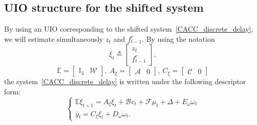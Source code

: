 {\subsection{UIO structure for the shifted system}\label{obs_structure}
By using an UIO corresponding to the shifted system~\eqref{CACC_discrete_delay}, we will estimate simultaneously $z_{t}$ and $f^{c}_{t-1}$. By using the notation
$$
\xi_{t} \triangleq \begin{bmatrix} z_{t} \\ f^{c}_{t-1}\end{bmatrix},
$$
$$
\mathbb{E} =\begin{bmatrix} \mathbb{I}_{3} & \mathcal{W}\end{bmatrix},~
    A_{\xi}=\begin{bmatrix} \mathcal{A} & 0 \end{bmatrix},~
    C_{\xi} = \begin{bmatrix} \mathcal{C}& 0 \end{bmatrix} 
$$
the system~\eqref{CACC_discrete_delay} is written under the following descriptor form:
\begin{equation}
    \left\{\begin{array}{l}
    \mathbb{E} \xi_{t+1} = A_{\xi} \xi_t + \mathcal{B} v_{t} + \mathcal{F} \mu_{t} + \Delta + E_{\omega} \omega_{t} \\
    \bar{y}_{t} = C_{\xi} \xi_t + D_{\omega} \omega_{t}.

\end{array}
\end{equation}}
